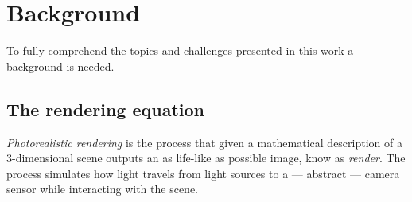 \section{Background}

To fully comprehend the topics and challenges presented in this work a background is needed.

\subsection{The rendering equation}
\textit{Photorealistic rendering} is the process that given a mathematical description of a 3-dimensional scene outputs an as life-like as possible image, know as \textit{render}. The process simulates how light travels from light sources to a --- abstract --- camera sensor while interacting with the scene.

